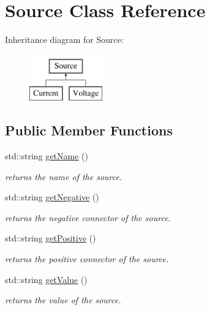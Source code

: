 \hypertarget{class_s_p_i_c_e_1_1_source}{}\section{Source Class Reference}
\label{class_s_p_i_c_e_1_1_source}
Inheritance diagram for Source\+:\begin{figure}[H]
\begin{center}
\leavevmode
\includegraphics[height=2.000000cm]{class_s_p_i_c_e_1_1_source}
\end{center}
\end{figure}
\subsection*{Public Member Functions}
\begin{DoxyCompactItemize}
\item 
\mbox{\label{class_s_p_i_c_e_1_1_source_ac0fc966d4386ddb71d99361e3fccb311}} 
std\+::string \mbox{\hyperlink{class_s_p_i_c_e_1_1_source_ac0fc966d4386ddb71d99361e3fccb311}{get\+Name}} ()
\begin{DoxyCompactList}\small\item\em returns the name of the source. \end{DoxyCompactList}\item 
\mbox{\label{class_s_p_i_c_e_1_1_source_a8b4ab73ed1d99c533aa22af0a37ebb0d}} 
std\+::string \mbox{\hyperlink{class_s_p_i_c_e_1_1_source_a8b4ab73ed1d99c533aa22af0a37ebb0d}{get\+Negative}} ()
\begin{DoxyCompactList}\small\item\em returns the negative connector of the source. \end{DoxyCompactList}\item 
\mbox{\label{class_s_p_i_c_e_1_1_source_a1adb347b9a2c2da556e4417ab0eec0e1}} 
std\+::string \mbox{\hyperlink{class_s_p_i_c_e_1_1_source_a1adb347b9a2c2da556e4417ab0eec0e1}{get\+Positive}} ()
\begin{DoxyCompactList}\small\item\em returns the positive connector of the source. \end{DoxyCompactList}\item 
\mbox{\label{class_s_p_i_c_e_1_1_source_a4c052cb2622c580a250b2c783a436882}} 
std\+::string \mbox{\hyperlink{class_s_p_i_c_e_1_1_source_a4c052cb2622c580a250b2c783a436882}{get\+Value}} ()
\begin{DoxyCompactList}\small\item\em returns the value of the source. \end{DoxyCompactList}\end{DoxyCompactItemize}
